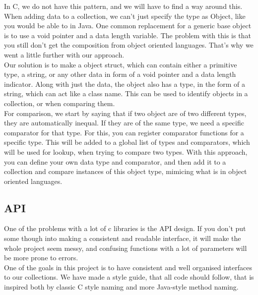 \documentclass[11pt, letterpaper, twoside, openright]{book}
\begin{document}
    In C, we do not have this pattern, and we will have to find a way around this. When adding data to a collection, we can't just specify the type as Object, like you would be able to in Java. One common replacement for a generic base object is to use a void pointer and a data length variable. The problem with this is that you still don't get the composition from object oriented languages. That's why we went a little further with our approach.\\

    Our solution is to make a object struct, which can contain either a primitive type, a string, or any other data in form of a void pointer and a data length indicator. Along with just the data, the object also has a type, in the form of a string, which can act like a class name. This can be used to identify objects in a collection, or when comparing them.\\

    For comparison, we start by saying that if two object are of two different types, they are automatically inequal. If they are of the same type, we need a specific comparator for that type. For this, you can register comparator functions for a specific type. This will be added to a global list of types and comparators, which will be used for lookup, when trying to compare two types. With this approach, you can define your own data type and comparator, and then add it to a collection and compare instances of this object type, mimicing what is in object oriented languages.

  \subsection{API}
    One of the problems with a lot of c libraries is the API design. If you don't put some though into making a consistent and readable interface, it will make the whole project seem messy, and confusing functions with a lot of parameters will be more prone to errors.\\

    One of the goals in this project is to have consistent and well organised interfaces to our collections. We have made a style guide, that all code should follow, that is inspired both by classic C style naming and more Java-style method naming.

  
\end{document}

